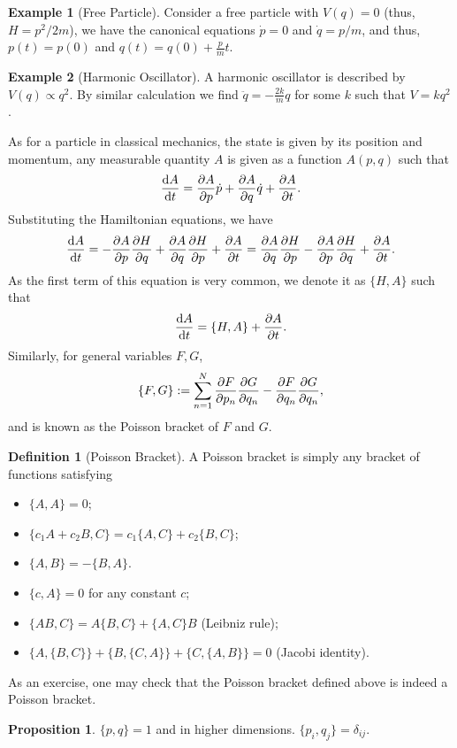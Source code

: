 \documentclass[]{article}
\theoremstyle{definition}
\theoremstyle{definition}
\newtheorem{definition}{Definition}[section]
\newtheorem{proposition}{Proposition}[section]
\newtheorem{example}{Example}[section]
\begin{document}
\begin{example}[Free Particle]
  Consider a free particle with \(V(q) = 0\) (thus, \(H = p^2 / 2m\)), we have 
  the canonical equations \(\dot p = 0\) and \(\dot q = p / m\), and thus, 
  \(p(t) = p(0)\) and \(q(t) = q(0) + \frac{p}{m} t\).
\end{example}

\begin{example}[Harmonic Oscillator]
  A harmonic oscillator is described by \(V(q) \propto q^2\). By similar calculation 
  we find \(\ddot q = - \frac{2k}{m} q\) for some \(k\) such that \(V = k q^2\).
\end{example}

As for a particle in classical mechanics, the state is given by its position and 
momentum, any measurable quantity \(A\) is given as a function \(A(p, q)\) 
such that 
\[\dv{A}{t} = \pdv{A}{p}\dot p + \pdv{A}{q} \dot q + \pdv{A}{t}.\]
Substituting the Hamiltonian equations, we have 
\[\dv{A}{t} = - \pdv{A}{p} \pdv{H}{q} + \pdv{A}{q} \pdv{H}{p} + \pdv{A}{t}
  = \pdv{A}{q} \pdv{H}{p} - \pdv{A}{p} \pdv{H}{q} + \pdv{A}{t}.\]
As the first term of this equation is very common, we denote it as \(\{H, A\}\) 
such that 
\[\dv{A}{t} = \{H, A\} + \pdv{A}{t}.\] 
Similarly, for general variables \(F, G\), 
\[\{F, G\} := \sum_{n = 1}^N \pdv{F}{p_n}\pdv{G}{q_n} - \pdv{F}{q_n}\pdv{G}{q_n},\]
and is known as the Poisson bracket of \(F\) and \(G\).

\begin{definition}[Poisson Bracket]
  A Poisson bracket is simply any bracket of functions satisfying 
  \begin{itemize}
    \item \(\{A, A\} = 0\);
    \item \(\{c_1 A + c_2 B, C\} = c_1\{A, C\} + c_2\{B, C\}\);
    \item \(\{A, B\} = -\{B, A\}\).
    \item \(\{c, A\} = 0\) for any constant \(c\);
    \item \(\{AB, C\} = A\{B, C\} + \{A, C\}B\) (Leibniz rule);
    \item \(\{A, \{B, C\}\} + \{B, \{C, A\}\} + \{C, \{A, B\}\} = 0\) (Jacobi identity).
  \end{itemize}
\end{definition}
As an exercise, one may check that the Poisson bracket defined above is indeed 
a Poisson bracket.
\begin{proposition}
  \(\{p, q\} = 1\) and in higher dimensions. \(\{p_i, q_j\} = \delta_{ij}\).
\end{proposition}
\end{document}
